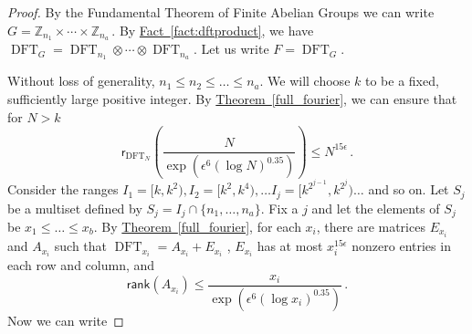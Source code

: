 \documentclass[11pt]{article}
\numberwithin{equation}{section}
\theoremstyle{definition}
\theoremstyle{plain}
\newcommand{\Z}{\mathbb Z}
\newcommand{\expref}[2]{\hyperref[#2]{#1~\ref{#2}}}
\theoremstyle{definition}
\renewcommand\Z{{\mathbb{Z}}}
\newcommand\rank{\textsf{rank}}
\DeclareMathOperator{\DFT}{DFT}
\begin{document}
\begin{proof}
By the Fundamental Theorem of Finite Abelian Groups we can write 
$G = \Z_{n_1} \times \cdots \times \Z_{n_a}$\,.
%
By \expref{Fact}{fact:dftproduct},
%
%
we have $\DFT_G = \DFT_{n_1} \otimes \cdots \otimes \DFT_{n_a}$.  
Let us write $F = \DFT_G$. 
 
Without loss of generality, $n_1 \leq n_2 \leq \dots \leq n_a$.  We will choose $k$ to be a fixed, sufficiently large positive integer.  By \expref{Theorem}{full_fourier}, we can ensure that for $N > k$
%
%
%
%
\[
\textsf{r}_{\DFT_N}\left(\frac{N}{\exp\left(\epsilon^6 (\log N)^{0.35}\right)} \right) \leq N^{15 \epsilon} \,.
\]
%
Consider the ranges $I_1 = [k,k^2), I_2 = [k^2, k^4), \dots I_j = [k^{2^{j-1}},k^{2^j}) \dots $ and so on.  Let $S_j$ be a multiset defined by $S_j = I_j \cap \{n_1, \dots, n_a \}$.  Fix a $j$ and let the elements of $S_j$ be $x_1 \leq \dots \leq x_b$.  By \expref{Theorem}{full_fourier}, for each $x_i$, there are matrices $E_{x_i}$ and $A_{x_i}$ such that %
$\DFT_{x_i} = A_{x_i} + E_{x_i}$ %
, $E_{x_i}$ has at most $x_i^{15\epsilon}$ nonzero entries in each row and column, and 
\[
\rank(A_{x_i}) \leq \frac{x_i}{\exp\left(\epsilon^6 (\log x_i)^{0.35}\right)} \,.
\]
Now we can write


\end{proof}
\end{document}
